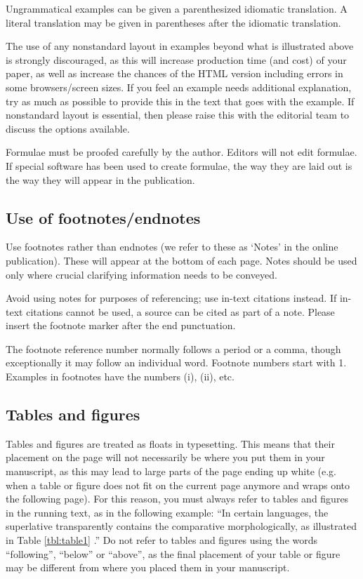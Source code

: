 \documentclass[charis,linguex]{glossa}
\begin{document}
Ungrammatical examples can be given a parenthesized idiomatic translation. A literal translation may be given in parentheses after the idiomatic translation.

The use of any nonstandard layout in examples beyond what is illustrated above is strongly discouraged, as this will increase production time (and cost) of your paper, as well as increase the chances of the HTML version including errors in some browsers/screen sizes. If you feel an example needs additional explanation, try as much as possible to provide this in the text that goes with the example. If nonstandard layout is essential, then please raise this with the editorial team to discuss the options available.

Formulae must be proofed carefully by the author. Editors will not edit formulae. If special software has been used to create formulae, the way they are laid out is the way they will appear in the publication.

\subsection{Use of footnotes/endnotes}\label{fn}

Use footnotes rather than endnotes (we refer to these as ‘Notes’ in the online publication). These will appear at the bottom of each page. Notes should be used only where crucial clarifying information needs to be conveyed. 

Avoid using notes for purposes of referencing; use in-text citations instead. If in-text citations cannot be used, a source can be cited as part of a note. Please insert the footnote marker after the end punctuation.

The footnote reference number normally follows a period or a comma, though exceptionally it may follow an individual word. Footnote numbers start with 1. Examples in footnotes have the numbers (i), (ii), etc.

\subsection{Tables and figures}

Tables and figures are treated as floats in typesetting. This means that their placement on the page will not necessarily be where you put them in your manuscript, as this may lead to large parts of the page ending up white (e.g. when a table or figure does not fit on the current page anymore and wraps onto the following page). For this reason, you must always refer to tables and figures in the running text, as in the following example: ``In certain languages, the superlative transparently contains the comparative morphologically, as illustrated in Table \ref{tbl:table1} \citep[46]{Bobaljik2012}.'' Do not refer to tables and figures using the words ``following'', ``below'' or ``above'', as the final placement of your table or figure may be different from where you placed them in your manuscript.
\end{document}
